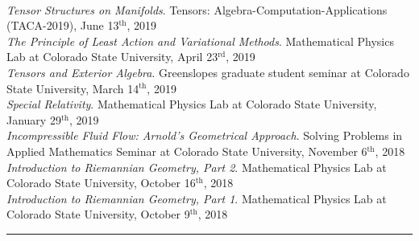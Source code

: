 \documentclass[12pt]{article} %
\begin{document}
\begin{flushleft}
    \\
    \vspace*{5pt}
    \emph{Tensor Structures on Manifolds}. Tensors: Algebra-Computation-Applications (TACA-2019), June 13$^\textrm{th}$, 2019 \\
    \vspace*{5pt}
    \emph{The Principle of Least Action and Variational Methods}. Mathematical Physics Lab at Colorado State University, April 23$^\textrm{rd}$, 2019 \\
    \vspace*{5pt}
    \emph{Tensors and Exterior Algebra}. Greenslopes graduate student seminar at Colorado State University, March 14$^\textrm{th}$, 2019\\
    \vspace*{5pt}
    \emph{Special Relativity}. Mathematical Physics Lab at Colorado State University, January 29$^\textrm{th}$, 2019\\
    \vspace*{5pt}
    \emph{Incompressible Fluid Flow: Arnold's Geometrical Approach}. Solving Problems in Applied Mathematics Seminar at Colorado State University, November 6$^\textrm{th}$, 2018\\
    \vspace*{5pt}
    \emph{Introduction to Riemannian Geometry, Part 2}. Mathematical Physics Lab at Colorado State University, October 16$^\textrm{th}$, 2018\\
    \vspace*{5pt}
    \emph{Introduction to Riemannian Geometry, Part 1}. Mathematical Physics Lab at Colorado State University, October 9$^\textrm{th}$, 2018
\end{flushleft}

\rule{\textwidth}{0.5mm}
\end{document}
